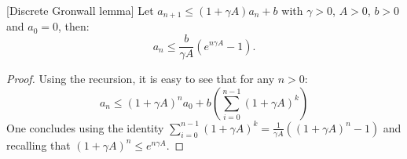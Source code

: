 

\begin{lemma}
\label{lem:Discrete-Gronwall-lemma}[Discrete Gronwall lemma]
Let $a_{n+1}\leq(1+\gamma A)a_{n}+b$ with $\gamma>0$, $A>0$,
$b>0$ and $a_0=0$, then: 
\[
a_{n}\leq\frac{b}{\gamma A}(e^{n\gamma A}-1).
\]
\end{lemma}
\begin{proof}
	Using the recursion, it is easy to see that for any $n>0$:
	\[
	a_n \leq (1+\gamma A)^n a_0 + b(\sum_{i=0}^{n-1}(1+\gamma A )^{k}) 
	\]
	One concludes using the identity $\sum_{i=0}^{n-1}(1+\gamma A )^{k} =\frac{1}{\gamma A}((1+\gamma A)^{n} -1)$ and recalling that $(1+\gamma A)^{n} \leq e^{n\gamma A}$.
\end{proof}


%


